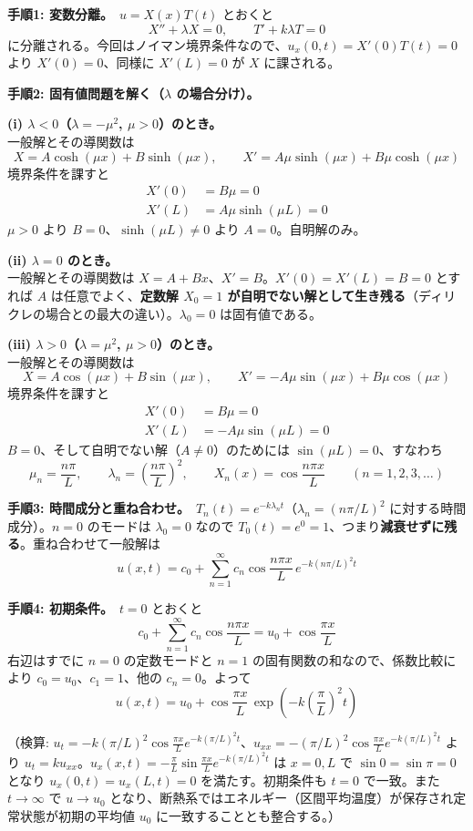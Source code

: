 
\textbf{手順1: 変数分離。}\ $u = X(x)T(t)$ とおくと
\[
X'' + \lambda X = 0, \qquad T' + k\lambda T = 0
\]
に分離される。今回はノイマン境界条件なので、$u_x(0,t) = X'(0)T(t) = 0$ より $X'(0) = 0$、同様に $X'(L) = 0$ が $X$ に課される。

\textbf{手順2: 固有値問題を解く（$\lambda$ の場合分け）。}

\textbf{(i) $\lambda < 0$（$\lambda = -\mu^{2}$, $\mu>0$）のとき。}\\
一般解とその導関数は
\[
X = A\cosh(\mu x) + B\sinh(\mu x), \qquad
X' = A\mu\sinh(\mu x) + B\mu\cosh(\mu x)
\]
境界条件を課すと
\begin{align*}
X'(0) &= B\mu = 0 \\
X'(L) &= A\mu\sinh(\mu L) = 0
\end{align*}
$\mu > 0$ より $B = 0$、$\sinh(\mu L) \neq 0$ より $A = 0$。自明解のみ。

\textbf{(ii) $\lambda = 0$ のとき。}\\
一般解とその導関数は $X = A + Bx$、$X' = B$。$X'(0) = X'(L) = B = 0$ とすれば $A$ は任意でよく、\textbf{定数解 $X_0 = 1$ が自明でない解として生き残る}（ディリクレの場合との最大の違い）。$\lambda_0 = 0$ は固有値である。

\textbf{(iii) $\lambda > 0$（$\lambda = \mu^{2}$, $\mu>0$）のとき。}\\
一般解とその導関数は
\[
X = A\cos(\mu x) + B\sin(\mu x), \qquad
X' = -A\mu\sin(\mu x) + B\mu\cos(\mu x)
\]
境界条件を課すと
\begin{align*}
X'(0) &= B\mu = 0 \\
X'(L) &= -A\mu\sin(\mu L) = 0
\end{align*}
$B = 0$、そして自明でない解（$A \neq 0$）のためには $\sin(\mu L) = 0$、すなわち
\[
\mu_n = \frac{n\pi}{L}, \qquad \lambda_n = \left(\frac{n\pi}{L}\right)^{2}, \qquad X_n(x) = \cos\frac{n\pi x}{L} \qquad (n = 1, 2, 3, \dots)
\]

\textbf{手順3: 時間成分と重ね合わせ。}\ $T_n(t) = e^{-k\lambda_n t}$（$\lambda_n=(n\pi/L)^2$ に対する時間成分）。$n=0$ のモードは $\lambda_0 = 0$ なので $T_0(t) = e^{0} = 1$、つまり\textbf{減衰せずに残る}。重ね合わせて一般解は
\[
u(x,t) = c_0 + \sum_{n=1}^{\infty} c_n \cos\frac{n\pi x}{L}\,e^{-k(n\pi/L)^2 t}
\]

\textbf{手順4: 初期条件。}\ $t=0$ とおくと
\[
c_0 + \sum_{n=1}^{\infty} c_n \cos\frac{n\pi x}{L} = u_0 + \cos\frac{\pi x}{L}
\]
右辺はすでに $n=0$ の定数モードと $n=1$ の固有関数の和なので、係数比較により $c_0 = u_0$、$c_1 = 1$、他の $c_n = 0$。よって
\[
\boxed{\; u(x,t) = u_0 + \cos\frac{\pi x}{L}\,\exp\!\left(-k\left(\frac{\pi}{L}\right)^{2} t\right) \;}
\]

（検算: $u_t = -k(\pi/L)^2\cos\frac{\pi x}{L}e^{-k(\pi/L)^2t}$、$u_{xx} = -(\pi/L)^2\cos\frac{\pi x}{L}e^{-k(\pi/L)^2t}$ より $u_t = k u_{xx}$。$u_x(x,t) = -\frac{\pi}{L}\sin\frac{\pi x}{L}e^{-k(\pi/L)^2t}$ は $x=0,L$ で $\sin 0 = \sin\pi = 0$ となり $u_x(0,t)=u_x(L,t)=0$ を満たす。初期条件も $t=0$ で一致。また $t\to\infty$ で $u \to u_0$ となり、断熱系ではエネルギー（区間平均温度）が保存され定常状態が初期の平均値 $u_0$ に一致することとも整合する。）
